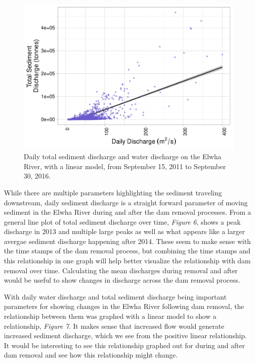\documentclass[12pt,]{article}
\begin{document}
\begin{figure}
\centering
\includegraphics{Mason_ENV872_ProjectFinal_files/figure-latex/Exploratory Analysis Figure 7-1.pdf}
\caption{Daily total sediment discharge and water discharge on the Elwha
River, with a linear model, from September 15, 2011 to September 30,
2016.}
\end{figure}

\newpage

While there are multiple parameters highlighting the sediment traveling
downstream, daily sediment discharge is a straight forward parameter of
moving sediment in the Elwha River during and after the dam removal
processes. From a general line plot of total sediment discharge over
time, \emph{Figure 6}, shows a peak discharge in 2013 and multiple large
peaks as well as what appears like a larger avergae sediment discharge
happening after 2014. These seem to make sense with the time stamps of
the dam removal process, but combining the time stamps and this
relationship in one graph will help better visualize the relationship
with dam removal over time. Calculating the mean discharges during
removal and after would be useful to show changes in discharge across
the dam removal process.

With daily water discharge and total sediment discharge being important
parameters for showing changes in the Elwha River following dam removal,
the relationship between them was graphed with a linear model to show a
relationship, \emph{Figure 7}. It makes sense that increased flow would
generate increased sediment discharge, which we see from the positive
linear relationship. It would be interesting to see this relationship
graphed out for during and after dam removal and see how this
relationship might change.
\end{document}
